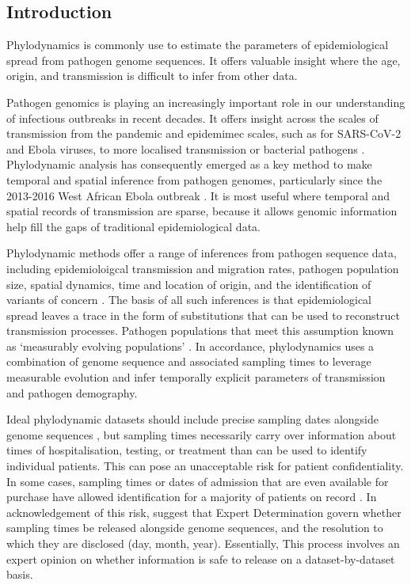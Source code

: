 \documentclass[11pt]{article}
\begin{document}
\begin{spacing}{1.5}
\linenumbers

\section*{Introduction}

Phylodynamics is commonly use to estimate the parameters of epidemiological spread from pathogen genome sequences. It offers valuable insight where the age, origin, and transmission is difficult to infer from other data. 


Pathogen genomics is playing an increasingly important role in our understanding of infectious outbreaks in recent decades. It offers insight across the scales of transmission from the pandemic and epidemimec scales, such as for SARS-CoV-2 and Ebola viruses, to more localised transmission or bacterial pathogens \citep{lancet2021genomic}. Phylodynamic analysis has consequently emerged as a key method to make temporal and spatial inference from pathogen genomes, particularly since the 2013-2016 West African Ebola outbreak \citep{mbala2019medical}. It is most useful where temporal and spatial records of transmission are sparse, because it allows genomic information help fill the gaps of traditional epidemiological data.

Phylodynamic methods offer a range of inferences from pathogen sequence data, including epidemioloigcal transmission and migration rates, pathogen population size, spatial dynamics, time and location of origin, and the identification of variants of concern \citep{featherstone2022epidemiological, attwood2022phylogenetic, du2015getting,volz_fitness_2023}. The basis of all such inferences is that epidemiological spread leaves a trace in the form of substitutions that can be used to reconstruct transmission processes. Pathogen populations that meet this assumption known as `measurably evolving populations' \citep{drummond2003measurably, biek_measurably_2015}. In accordance, phylodynamics uses a combination of genome sequence and associated sampling times to leverage measurable evolution and infer temporally explicit parameters of transmission and pathogen demography.

Ideal phylodynamic datasets should include precise sampling dates alongside genome sequences \citep{black2020ten}, but sampling times necessarily carry over information about times of hospitalisation, testing, or treatment than can be used to identify individual patients. This can pose an unacceptable risk for patient confidentiality. In some cases, sampling times or dates of admission that are even available for purchase have allowed identification for a majority of patients on record \citep{sweeney_matching_2013,shean_private_2018}. In acknowledgement of this risk, \citet{shean_private_2018} suggest that Expert Determination govern whether sampling times be released alongside genome sequences, and the resolution to which they are disclosed (day, month, year). Essentially, This process involves an expert opinion on whether information is safe to release on a dataset-by-dataset basis.


\end{spacing}
\end{document}
